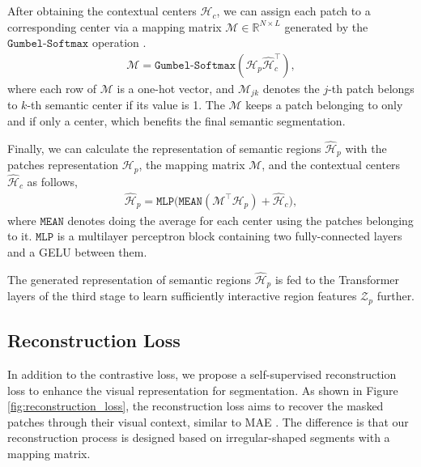 \documentclass{article}
\theoremstyle{plain}
\theoremstyle{definition}
\theoremstyle{remark}
\begin{document}
After obtaining the contextual centers $\hat{\mathcal{H}}_c$, we can assign each patch to a corresponding center via a mapping matrix $\mathcal{M} \in \mathbb{R}^{N \times L}$ generated by the $\texttt{Gumbel-Softmax}$ operation \cite{Jang2017Gumbel,Xu2022GroupViT}. 
\begin{align}
	\mathcal{M} = \texttt{Gumbel-Softmax}(\mathcal{H}_p\hat{\mathcal{H}}_c^{\top}),
\end{align}
where each row of $\mathcal{M}$ is a one-hot vector, and $\mathcal{M}_{jk}$ denotes the $j$-th patch belongs to $k$-th semantic center if its value is 1. The $\mathcal{M}$ keeps a patch belonging to only and if only a center, which benefits the final semantic segmentation. 

Finally, we can calculate the representation of semantic regions $\hat{\mathcal{H}}_p$ with the patches representation $\mathcal{H}_p$, the mapping matrix $\mathcal{M}$, and the contextual centers $\hat{\mathcal{H}}_c$ as follows,
\begin{align}
	\hat{\mathcal{H}}_p = \texttt{MLP}\big(\texttt{MEAN}(\mathcal{M}^{\top}\mathcal{H}_p) + \hat{\mathcal{H}}_c \big),
\end{align}
where $\texttt{MEAN}$ denotes doing the average for each center using the patches belonging to it. $\texttt{MLP}$ is a multilayer perceptron block containing two fully-connected layers and a GELU \cite{hendrycks2016gaussian} between them.

The generated representation of semantic regions $\hat{\mathcal{H}}_p$ is fed to the Transformer layers of the third stage to learn sufficiently interactive region features $\mathcal{Z}_p$ further.

\subsection{Reconstruction Loss}
In addition to the contrastive loss, we propose a self-supervised reconstruction loss to enhance the visual representation for segmentation. As shown in Figure \ref{fig:reconstruction_loss}, the reconstruction loss aims to recover the masked patches through their visual context, similar to MAE \cite{He2022Masked}. The difference is that our reconstruction process is designed based on irregular-shaped segments with a mapping matrix. 
\end{document}
